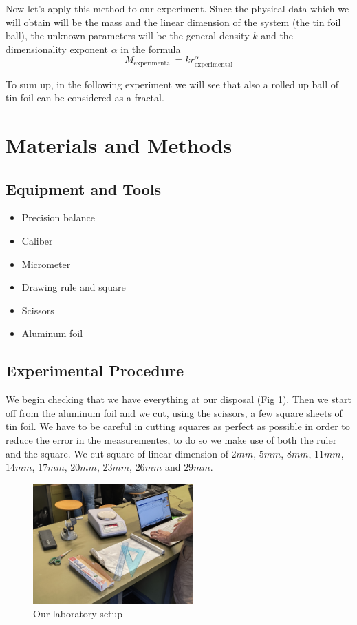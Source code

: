 \documentclass[a4paper,12pt]{article}
\begin{document}
\par Now let's apply this method to our experiment. Since the physical data which we 
will obtain will be the mass and the linear dimension of the system 
(the tin foil ball), the unknown parameters will be the general density $k$ and 
the dimensionality exponent $\alpha$ in the formula
\begin{equation} 
    M_{\text{experimental}} = k r_{\text{experimental}}^{\alpha}
    \label{eq:gen_fractal}
\end{equation}   

To sum up, in the following experiment we will see that also a rolled up ball of 
tin foil can be considered as a fractal.


\section{Materials and Methods}
\subsection{Equipment and Tools}
\begin{itemize}
    \item Precision balance
    \item Caliber
    \item Micrometer
    \item Drawing rule and square
    \item Scissors
    \item Aluminum foil
\end{itemize}

\subsection{Experimental Procedure}
We begin checking that we have everything at our disposal (Fig \ref{fig:lab_instr}).
Then we start off from the aluminum foil and we cut, using the scissors, a few square sheets of tin foil. 
We have to be careful in cutting squares as perfect as possible in order to reduce the error in 
the measurementes, to do so we make use of both the ruler and the square. We cut square of linear 
dimension of $2 mm$, $5 mm$, $8 mm$, $11 mm$, $14 mm$, $17 mm$, $20 mm$, $23 mm$, $26 mm$ and $29 mm$.

\begin{figure}[h]
    \centering
    \includegraphics[width = 0.55\textwidth]{Lab_instruments.jpg}
    \caption{Our laboratory setup}
    \label{fig:lab_instr}
\end{figure}
\end{document}
